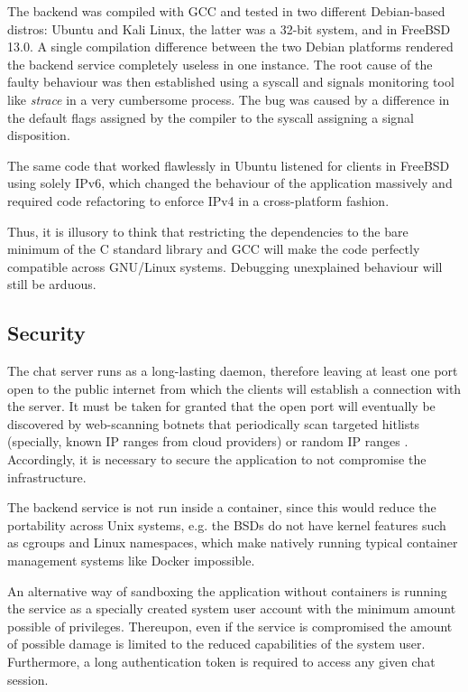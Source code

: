 The backend was compiled with GCC and tested in two different Debian-based distros: Ubuntu and Kali Linux, the latter was a 32-bit system, and in FreeBSD 13.0. A single compilation difference between the two Debian platforms rendered the backend service completely useless in one instance. The root cause of the faulty behaviour was then established using a syscall and signals monitoring tool like \textit{strace} in a very cumbersome process. The bug was caused by a difference in the default flags assigned by the compiler to the syscall assigning a signal disposition.

The same code that worked flawlessly in Ubuntu listened for clients in FreeBSD using solely IPv6, which changed the behaviour of the application massively and required code refactoring to enforce IPv4 in a cross-platform fashion.

Thus, it is illusory to think that restricting the dependencies to the bare minimum of the C standard library and GCC will make the code perfectly compatible across GNU/Linux systems. Debugging unexplained behaviour will still be arduous.

\subsection{Security}
The chat server runs as a long-lasting daemon, therefore leaving at least one port open to the public internet from which the clients will establish a connection with the server. It must be taken for granted that the open port will eventually be discovered by web-scanning botnets that periodically scan targeted hitlists (specially, known IP ranges from cloud providers) or random IP ranges \cite{Mirkovic2004}. Accordingly, it is necessary to secure the application to not compromise the infrastructure.

The backend service is not run inside a container, since this would reduce the portability across Unix systems, e.g. the BSDs do not have kernel features such as cgroups and Linux namespaces, which make natively running typical container management systems like Docker impossible.

An alternative way of sandboxing the application without containers is running the service as a specially created system user account with the minimum amount possible of privileges. Thereupon, even if the service is compromised the amount of possible damage is limited to the reduced capabilities of the system user. Furthermore, a long authentication token is required to access any given chat session.